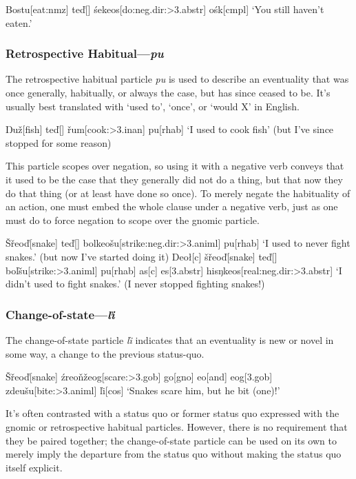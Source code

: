 \documentclass[a4paper,11pt,oneside,openany]{memoir}
\newcommand{\vd}{ď}
\newcommand{\vz}{ž}
\newcommand{\vs}{š}
\newcommand{\vr}{ř}
\newcommand{\vl}{ľ}
\newcommand{\vn}{ň}
\newcommand{\vS}{Š}
\newcommand{\Engma}{Ŋ}
\newcommand{\engma}{ŋ}
\begin{document}
\ex 
\begingl
Bostu[eat:{\sc nmz}]
te\vd[]
\'sekeos[do:{\sc neg.dir:>3.abstr}]
o\'sk[\sc cmpl]
\glft `You still haven't eaten.'
\endgl
\xe

\subsubsection{Retrospective Habitual---\textit{pu}}

The retrospective habitual particle \textit{pu} is used to describe an eventuality that was once generally, habitually, or always the case, but has since ceased to be. It's usually best translated with `used to', `once', or `would X' in English.

\ex 
\begingl
\Engma u\vz[fish]
te\vd[]
\vr um[cook:{\sc >3.inan}]
pu[\sc rhab]
\glft `I used to cook fish' (but I've since stopped for some reason)
\endgl
\xe

This particle scopes over negation, so using it with a negative verb conveys that it used to be the case that they generally did not do a thing, but that now they do that thing (or at least have done so once). To merely negate the habituality of an action, one must embed the whole clause under a negative verb, just as one must do to force negation to scope over the gnomic particle.

\pex 
\a
\begingl 
\vS\vr eo\vd[snake]
te\vd[]
bolkeo\vs u[strike:{\sc neg.dir:>3.animl}]
pu[\sc rhab]
\glft `I used to never fight snakes.' (but now I've started doing it)
\endgl 
\a
\begingl
Deo\l[\sc c]
\vs\vr eo\vd[snake]
te\vd[]
bo\vl\vs u[strike:{\sc >3.animl}]
pu[\sc rhab]
\nogloss{,}
as[\sc c]
es[\sc 3.abstr]
his\engma keos[real:{\sc neg.dir:>3.abstr}]
\glft `I didn't used to fight snakes.' (I never stopped fighting snakes!)
\endgl 
\xe

\subsubsection{Change-of-state---\textit{\vl i}}

The change-of-state particle \textit{\vl i} indicates that an eventuality is new or novel in some way, a change to the previous status-quo. 

\ex
\begingl
\vS\vr eo\vd[snake]
\'zreo\vn\vz eog[scare:{\sc >3.gob}]
go[\sc gno]
eo[and]
eog[\sc 3.gob]
zdeu\vs u[bite:{\sc >3.animl}]
\vl i[\sc cos]
\glft `Snakes scare him, but he bit (one)!'
\endgl
\xe

It's often contrasted with a status quo or former status quo expressed with the gnomic or retrospective habitual particles. However, there is no requirement that they be paired together; the change-of-state particle can be used on its own to merely imply the departure from the status quo without making the status quo itself explicit.
\end{document}
